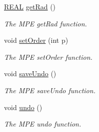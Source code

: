 \begin{DoxyCompactItemize}
\hyperlink{util_8h_a5821460e95a0800cf9f24c38915cbbde}{R\-E\-A\-L} \hyperlink{classCMPE_aa34361e7b83d5e63f866773e9c745588}{get\-Rad} ()
\begin{DoxyCompactList}\small\item\em The M\-P\-E get\-Rad function. \end{DoxyCompactList}\item 
void \hyperlink{classCMPE_a403e7cea8cfca8cb9e76dff5dc396c10}{set\-Order} (int p)
\begin{DoxyCompactList}\small\item\em The M\-P\-E set\-Order function. \end{DoxyCompactList}\item 
void \hyperlink{classCMPE_ad67fb6e520dbc05e63152b18a6363014}{save\-Undo} ()
\begin{DoxyCompactList}\small\item\em The M\-P\-E save\-Undo function. \end{DoxyCompactList}\item 
void \hyperlink{classCMPE_a7033cf96c5b5f6301c6021c97a3f6d36}{undo} ()
\begin{DoxyCompactList}\small\item\em The M\-P\-E undo function. \end{DoxyCompactList}\end{DoxyCompactItemize}
